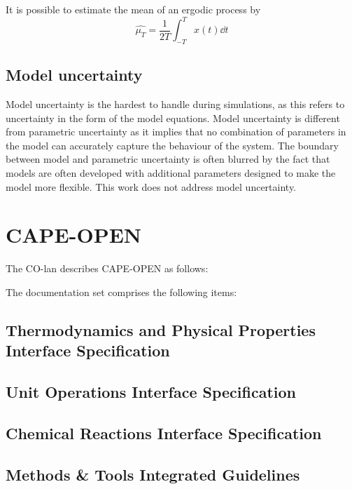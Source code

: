 It is possible to estimate the mean of an ergodic process by 
\begin{equation}
  \hat{\mu_T} = \frac{1}{2T} \int_{-T}^{T} x(t) \dd t
\end{equation}


\subsection{Model uncertainty}
Model uncertainty is the hardest to handle during simulations, as this
refers to uncertainty in the form of the model equations.  Model
uncertainty is different from parametric uncertainty as it implies
that no combination of parameters in the model can accurately capture
the behaviour of the system.  The boundary between model and
parametric uncertainty is often blurred by the fact that models are
often developed with additional parameters designed to make the model
more flexible.  This work does not address model uncertainty.



\section{CAPE-OPEN}
The CO-lan describes CAPE-OPEN as follows:

The documentation set comprises the following items:
\subsection{Thermodynamics and Physical Properties Interface Specification}

\subsection{Unit Operations Interface Specification}

\subsection{Chemical Reactions Interface Specification}

\subsection{Methods \& Tools Integrated Guidelines}

